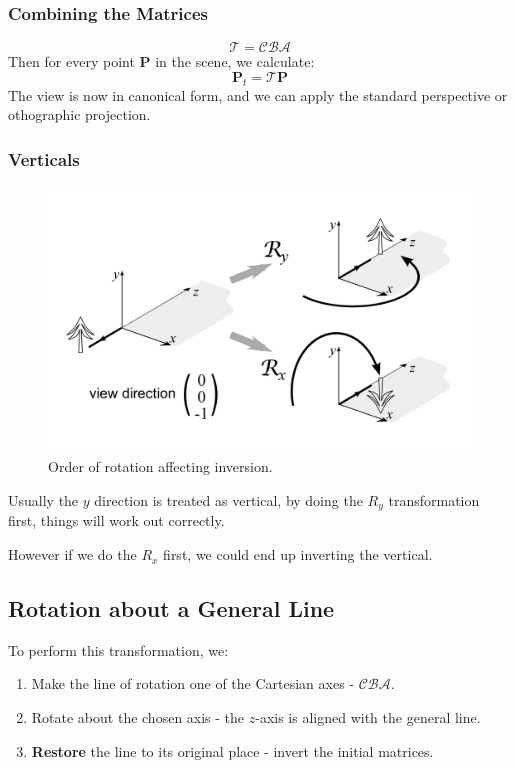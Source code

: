 \documentclass[11pt]{article}
\begin{document}
\subsubsection{Combining the Matrices}
\[
  \mathcal{T} = \mathcal{CBA}  
\]
Then for every point $\bm{P}$ in the scene, we calculate:
\[
  \bm{P}_t = \mathcal{T}\bm{P}  
\]
The view is now in canonical form, and we can apply the standard perspective or othographic projection.

\subsubsection{Verticals}
\begin{figure}[htb!]
  \caption{Order of rotation affecting inversion.}
  \includegraphics[scale=0.2]{invert}
  \centering
\end{figure}

Usually the $y$ direction is treated as vertical, by doing the $R_y$ transformation first, things will work out correctly.

However if we do the $R_x$ first, we could end up inverting the vertical.

\subsection{Rotation about a General Line}
To perform this transformation, we:
\begin{enumerate}
  \item Make the line of rotation one of the Cartesian axes - $\mathcal{CBA}$.
  \item Rotate about the chosen axis - the $z$-axis is aligned with the general line.
  \item \textbf{Restore} the line to its original place - invert the initial matrices.
\end{enumerate}
\end{document}
